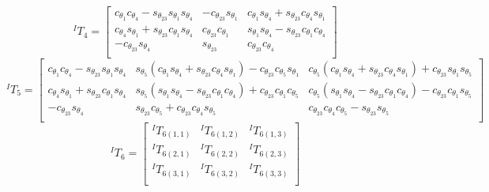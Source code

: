 \documentclass[12pt]{report}
\begin{document}
\[
^IT_4 =
\begin{bmatrix}
c_{\theta_1}c_{\theta_4} - s_{\theta_{23}}s_{\theta_1}s_{\theta_4}& -c_{\theta_{23}}s_{\theta_1}& c_{\theta_1}s_{\theta_4} + s_{\theta_{23}}c_{\theta_4}s_{\theta_1}\\
c_{\theta_4}s_{\theta_1} + s_{\theta_{23}}c_{\theta_1}s_{\theta_4}&  c_{\theta_{23}}c_{\theta_1}& s_{\theta_1}s_{\theta_4} - s_{\theta_{23}}c_{\theta_1}c_{\theta_4}\\
-c_{\theta_{23}}s_{\theta_4}&              s_{\theta_{23}}&                                       c_{\theta_{23}}c_{\theta_4}\\
\end{bmatrix}
\]
\[
^IT_5 =
\begin{bmatrix}
c_{\theta_1}c_{\theta_4} - s_{\theta_{23}}s_{\theta_1}s_{\theta_4}& s_{\theta_5}(c_{\theta_1}s_{\theta_4} + s_{\theta_{23}}c_{\theta_4}s_{\theta_1}) - c_{\theta_{23}}c_{\theta_5}s_{\theta_1}& c_{\theta_5}(c_{\theta_1}s_{\theta_4} +
 s_{\theta_{23}}c_{\theta_4}s_{\theta_1}) + c_{\theta_{23}}s_{\theta_1}s_{\theta_5}\\
c_{\theta_4}s_{\theta_1} + s_{\theta_{23}}c_{\theta_1}s_{\theta_4}& s_{\theta_5}(s_{\theta_1}s_{\theta_4} - s_{\theta_{23}}c_{\theta_1}c_{\theta_4}) + c_{\theta_{23}}c_{\theta_1}c_{\theta_5}& c_{\theta_5}(s_{\theta_1}s_{\theta_4} - s_{\theta_{23}}c_{\theta_1}c_{\theta_4}) - c_{\theta_{23}}c_{\theta_1}s_{\theta_5}\\
-c_{\theta_{23}}s_{\theta_4}&                                                     s_{\theta_{23}}c_{\theta_5} + c_{\theta_{23}}c_{\theta_4}s_{\theta_5}&                                                     c_{\theta_{23}}c_{\theta_4}c_{\theta_5} - s_{\theta_{23}}s_{\theta_5}\\
\end{bmatrix}
\]
\[
^IT_6 =
\begin{bmatrix}
  ^IT_{6(1,1)} & ^IT_{6(1,2)} & ^IT_{6(1,3)}\\
  ^IT_{6(2,1)} & ^IT_{6(2,2)} & ^IT_{6(2,3)}\\
  ^IT_{6(3,1)} & ^IT_{6(3,2)} & ^IT_{6(3,3)}\\
\end{bmatrix}
\]
\end{document}
